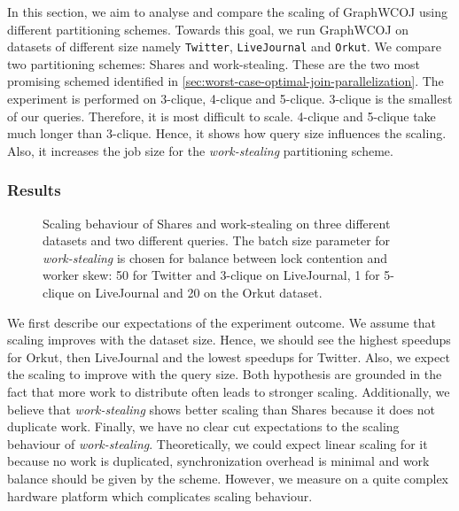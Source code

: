In this section, we aim to analyse and compare the scaling of Graph\textsc{WCOJ} using different
partitioning schemes.
Towards this goal, we run Graph\textsc{WCOJ} on datasets of different size namely \texttt{Twitter},
\texttt{LiveJournal} and \texttt{Orkut}.
We compare two partitioning schemes: Shares and work-stealing.
These are the two most promising schemed identified in \cref{sec:worst-case-optimal-join-parallelization}.
The experiment is performed on 3-clique, 4-clique and 5-clique.
3-clique is the smallest of our queries.
Therefore, it is most difficult to scale.
4-clique and 5-clique take much longer than 3-clique.
Hence, it shows how query size influences the scaling.
Also, it increases the job size for the \textit{work-stealing} partitioning scheme.


\subsubsection{Results}

\begin{figure}
    \centering
    \newline
    \caption{Scaling behaviour of Shares and work-stealing on three different datasets
      and two different queries.
      The batch size parameter for \textit{work-stealing} is chosen for balance between lock contention and worker skew:
      50 for Twitter and 3-clique on LiveJournal, 1 for 5-clique on LiveJournal and 20 on the Orkut dataset.
    }
    \label{fig:graphWCOJ-scaling}
\end{figure}

We first describe our expectations of the experiment outcome.
We assume that scaling improves with the dataset size.
Hence, we should see the highest speedups for Orkut, then LiveJournal and the lowest speedups for Twitter.
Also, we expect the scaling to improve with the query size.
Both hypothesis are grounded in the fact that more work to distribute often leads to stronger scaling.
Additionally, we believe that \textit{work-stealing} shows better scaling than Shares because it does not duplicate work.
Finally, we have no clear cut expectations to the scaling behaviour of \textit{work-stealing}.
Theoretically, we could expect linear scaling for it because no work is duplicated, synchronization overhead is minimal and
work balance should be given by the scheme.
However, we measure on a quite complex hardware platform which complicates scaling behaviour.

